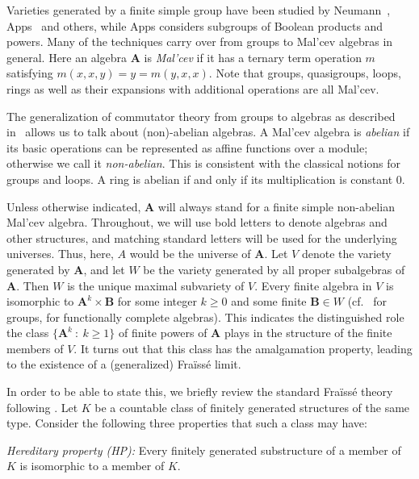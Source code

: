 \documentclass[12pt,a4paper,reqno]{amsart}
\numberwithin{equation}{section}
\theoremstyle{plain}
\theoremstyle{definition}
\newcommand{\A}{\mathbf{A}}
\newcommand{\B}{\mathbf{B}}
\newcommand{\st}{\: :\:}
\begin{document}
 Varieties generated by a finite simple group have been studied by Neumann~\cite{Ne:VG}, Apps~\cite{Ap:ACG} and others, 
 while Apps \cite{Ap:BPG} considers subgroups of Boolean products and powers.
 Many of the techniques carry over from groups to Mal'cev algebras in general. Here an algebra $\mathbf{A}$ is
 \emph{Mal'cev} if it has a ternary term operation $m$ satisfying $m(x,x,y) = y = m(y,x,x)$.
 Note that groups, quasigroups, loops, rings as well as their expansions
with additional operations
 are all Mal'cev.

 The generalization of commutator theory from groups to algebras as described in~\cite{FM:CTC} allows us to talk
 about (non)-abelian algebras. A Mal'cev algebra is \emph{abelian} if its basic operations can be represented
 as affine functions over a module; otherwise we call it \emph{non-abelian}. This is consistent with the classical
 notions for groups and loops. A ring is abelian if and only if its multiplication is constant $0$.

 Unless otherwise indicated, $\A$ will always stand for a finite simple non-abelian Mal'cev algebra.
 Throughout, we will use bold letters to denote algebras and other structures,
 and matching standard letters will be used for the underlying universes. Thus, here, $A$ would be the universe of $\A$.
 Let $V$ denote the variety generated by $\A$, and let $W$ be the variety generated by all proper subalgebras of $\A$.
 Then $W$ is the unique maximal subvariety of $V$.
 Every finite algebra in $V$ is isomorphic to $\A^k\times\B$ for
 some integer $k\geq 0$
 and some finite $\B\in W$ (cf.~\cite{Ne:VG} for groups, \cite{Fo:GBT2} for functionally complete algebras).
 This indicates the distinguished role the class $\{ \A^k\st k\geq 1\}$ of finite powers of $\A$ plays in the
 structure of the finite members of $V$.
 It turns out that this class has the amalgamation property, leading to the existence of a (generalized)
 Fra{\"i}ss{\'e} limit.
 
In order to be able to state this, we briefly review the standard Fra{\"i}ss{\'e} theory following \cite{Ho:MT}.
Let $K$ be a countable class of finitely generated structures of the same type.
Consider the following three properties that such a class may have:
\vspace{1mm}

\noindent
\textit{Hereditary property (HP):} Every finitely generated substructure of a member of $K$ is isomorphic to a member of $K$.
\vspace{1mm}
\end{document}

